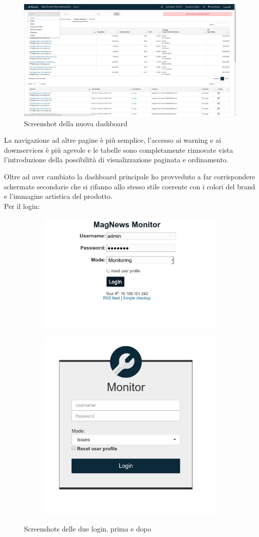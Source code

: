 \documentclass[a4paper]{article}
\begin{document}
\begin{figure}[H]
	\includegraphics[width=\textwidth]{dashboard_new.png}
	\centering
	\caption{Screenshot della nuova dashboard}
\end{figure}
La navigazione ad altre pagine è più semplice, l'accesso ai warning e ai downservices
è più agevole e le tabelle sono completamente rinnovate vista l'introduzione della possibilità di
visualizzazione paginata e ordinamento.
\par Oltre ad aver cambiato la dashboard principale ho provveduto a far corrispondere schermate secondarie
che si rifanno allo stesso stile coerente con i colori del brand e l'immagine artistica del prodotto.\\
Per il login:
\begin{figure}[H]
	\centering
	\begin{subfigure}
	  \centering
	  \includegraphics[width=0.45\linewidth]{login_old.png}
	\end{subfigure}%
	\begin{subfigure}
	  \centering
	  \includegraphics[width=0.45\linewidth]{login_new.png}
	\end{subfigure}
	\caption{Screenshots delle due login, prima e dopo}
\end{figure}
\end{document}

